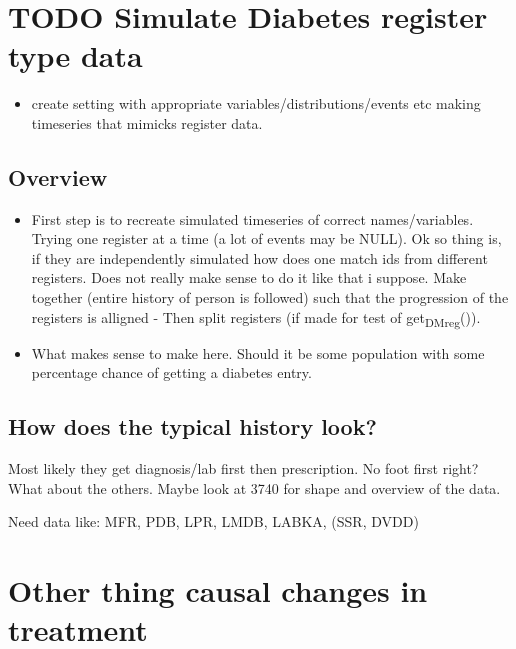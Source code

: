 \documentclass[11pt]{article}
\begin{document}
\section{{\bfseries\sffamily TODO} Simulate Diabetes register type data}
\label{sec:orgaa5c950}
\begin{itemize}
\item create setting with appropriate variables/distributions/events etc
making timeseries that mimicks register data.
\end{itemize}
\subsection{Overview}
\label{sec:org6dec8d9}
\begin{itemize}
\item First step is to recreate simulated timeseries of correct
names/variables. Trying one register at a time (a lot of events
may be NULL).
Ok so thing is, if they are independently simulated how does
one match ids from different registers. Does not really make
sense to do it like that i suppose. Make together (entire
history of person is followed) such that the progression of
the registers is alligned - Then split registers (if made for
test of get\textsubscript{DMreg}()).
\item What makes sense to make here. Should it be some population
with some percentage chance of getting a diabetes entry.
\end{itemize}
\subsection{How does the typical history look?}
\label{sec:orgcfaa026}
Most likely they get diagnosis/lab first then prescription. No foot first
right? What about the others. Maybe look at 3740 for shape and overview
of the data.

Need data like: MFR, PDB, LPR, LMDB, LABKA, (SSR, DVDD)
\section{Other thing causal changes in treatment}
\label{sec:org858473b}
\end{document}
